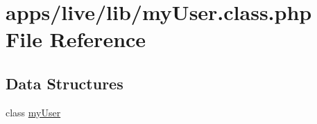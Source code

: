 \hypertarget{live_2lib_2my_user_8class_8php}{\section{apps/live/lib/my\-User.class.\-php File Reference}
\label{live_2lib_2my_user_8class_8php}
}
\subsection*{Data Structures}
\begin{DoxyCompactItemize}
\item 
class \hyperlink{classmy_user}{my\-User}
\end{DoxyCompactItemize}
